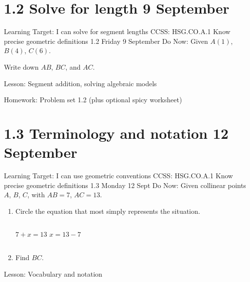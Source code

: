 \section{1.2 Solve for length \hfill 9 September}
\begin{frame}{Learning Target: I can solve for segment lengths}
  {CCSS: HSG.CO.A.1 Know precise geometric definitions  \hfill \alert{1.2 Friday 9 September}}
  Do Now: Given $A(1)$, $B(4)$, $C(6)$. \par \medskip
  Write down $AB$, $BC$, and $AC$.
  \begin{center}
  \end{center} \vspace{1cm}
  Lesson: Segment addition, solving algebraic models \par \medskip
  Homework: Problem set 1.2 (plus optional spicy worksheet)
  \end{frame}

\section{1.3 Terminology and notation \hfill 12 September}
\begin{frame}{Learning Target: I can use geometric conventions}
  {CCSS: HSG.CO.A.1 Know precise geometric definitions \hfill \alert{1.3 Monday 12 Sept}}
  Do Now: Given collinear points $A$, $B$, $C$, with $AB=7$, $AC=13$.
  \begin{center}
  \end{center}
  \begin{enumerate}
    \item Circle the equation that most simply represents the situation. \medskip
    \begin{columns}[c]
      \qquad \hspace{2cm} $7 + x = 13$
      $x = 13 - 7$
    \end{columns}
    \item Find $BC$.
  \end{enumerate} \vspace{2cm}
  Lesson: Vocabulary and notation
  \end{frame}

